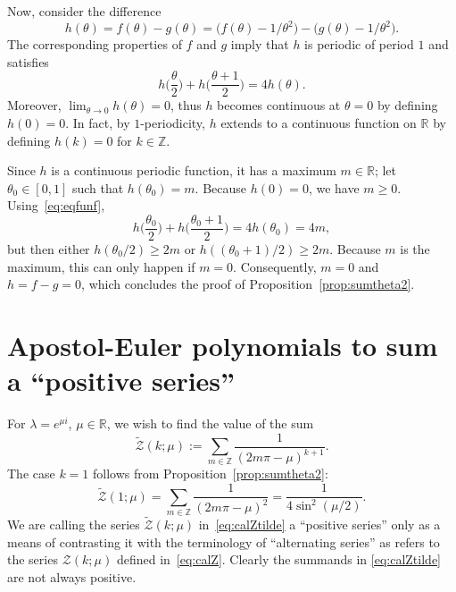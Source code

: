 \documentclass[11pt, oneside]{article}
\newcommand{\Z}{\mathbb{Z}}
\newcommand{\R}{\mathbb{R}}
\newcommand{\calZ}{\mathcal{Z}}
\theoremstyle{plain}
\theoremstyle{definition}
\begin{document}
Now, consider the difference
\begin{equation*}
  h(\theta) = f(\theta) - g(\theta) 
  = \big(f(\theta) - 1/\theta^2\big)  - \big(g(\theta) - 1/\theta^2\big).
\end{equation*}
The corresponding properties of $f$ and $g$ imply that $h$ is periodic of period $1$
and satisfies
\begin{equation}
\label{eq:eqfunf}
  h\Big(\frac{\theta}{2}\Big) + h\Big(\frac{\theta+1}{2}\Big)
  = 4h(\theta).
\end{equation}
Moreover, $\lim_{\theta\to0} h(\theta) = 0$, thus $h$ becomes continuous at $\theta=0$ by defining $h(0)=0$. In fact, by $1$-periodicity, $h$ extends to a continuous function on $\R$ by defining $h(k)=0$ for $k\in\Z$.

Since $h$ is a continuous periodic function, it has a maximum $m \in \R$; let $\theta_0 \in [0,1]$ such that $h(\theta_0) = m$. Because $h(0)=0$, we have $m \ge0$. Using~\eqref{eq:eqfunf},
\[
  h\Big(\frac{\theta_0}{2}\Big) + h\Big(\frac{\theta_0+1}{2}\Big)
  = 4h(\theta_0) = 4m,
\]
but then either $h(\theta_0/2) \ge 2m$ or $h((\theta_0+1)/2) \ge 2m$. Because $m$ is the maximum, this can only happen if $m=0$. Consequently, $m=0$ and $h = f - g =0$, which concludes the proof of Proposition~\ref{prop:sumtheta2}.

\section{Apostol-Euler polynomials to sum a ``positive series''}
\label{sec:musinalt}

For $\lambda = e^{\mu i}$, $\mu \in \R$, we wish to find the value of the sum
\begin{equation}
\label{eq:calZtilde}
  \widetilde{\calZ}(k;\mu) := \sum_{m\in\Z} \frac{1}{(2m\pi - \mu)^{k+1}}.
\end{equation}
The case $k=1$ follows from Proposition~\ref{prop:sumtheta2}:
\begin{equation}
\label{eq:summu2}
  \widetilde{\calZ}(1;\mu) = \sum_{m\in\Z} \frac{1}{(2m\pi-\mu)^2} = \frac{1}{4\sin^2(\mu/2)}.
\end{equation}
We are calling the series $\widetilde{\calZ}(k;\mu)$ in~\eqref{eq:calZtilde} a ``positive series'' only as a means of contrasting it with the terminology of ``alternating series'' as refers to the series $\calZ(k;\mu)$ defined in~\eqref{eq:calZ}. Clearly the summands in \eqref{eq:calZtilde} are not always positive.
\end{document}
